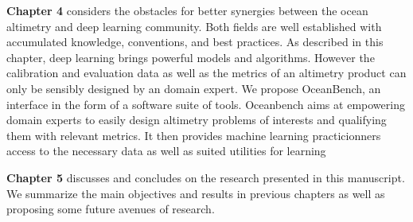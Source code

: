 \begin{bibunit}
\textbf{Chapter 4} considers the obstacles for better synergies between the ocean altimetry and deep learning community.
Both fields are well established with accumulated knowledge, conventions, and best practices. 
As described in this chapter, deep learning brings powerful models and algorithms.
However the calibration and evaluation data as well as the metrics of an altimetry product can only be sensibly designed by an domain expert. 
We propose OceanBench, an interface in the form of a software suite of tools.
Oceanbench aims at empowering domain experts to easily design altimetry problems of interests and qualifying them with relevant metrics. 
It then provides machine learning practicionners access to the necessary data as well as suited utilities for learning

\textbf{Chapter 5} discusses and concludes on the research presented in this manuscript. We summarize the main objectives and results in previous chapters as well as proposing some future avenues of research.
 
\end{bibunit}

